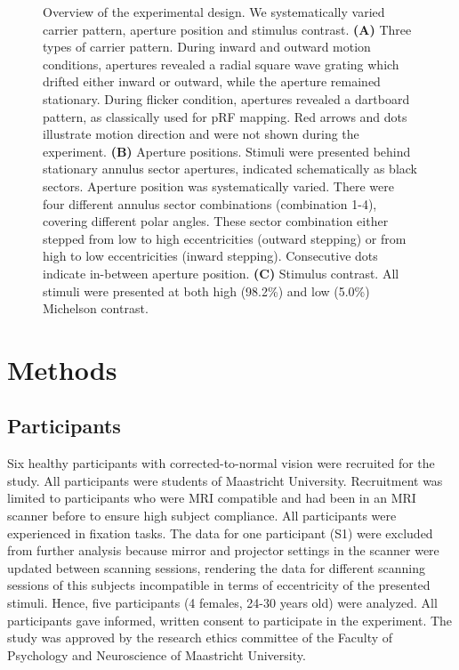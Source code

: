 \begin{figure}[ht!]
\ContinuedFloat
\captionsetup{labelformat=adja-page}
\caption{Overview of the experimental design. We systematically varied carrier pattern, aperture position and stimulus contrast. \textbf{(A)} Three types of carrier pattern. During inward and outward motion conditions, apertures revealed a radial square wave grating which drifted either inward or outward, while the aperture remained stationary. During flicker condition, apertures revealed a dartboard pattern, as classically used for pRF mapping. Red arrows and dots illustrate motion direction and were not shown during the experiment. \textbf{(B)} Aperture positions. Stimuli were presented behind stationary annulus sector apertures, indicated schematically as black sectors. Aperture position was systematically varied. There were four different annulus sector combinations (combination 1-4), covering different polar angles. These sector combination either stepped from low to high eccentricities (outward stepping) or from high to low eccentricities (inward stepping). Consecutive dots indicate in-between aperture position. \textbf{(C)} Stimulus contrast. All stimuli were presented at both high (98.2\%) and low (5.0\%) Michelson contrast.}
\label{fig:expOv}
\noindent\hrulefill
\end{figure}

\section{Methods}

\subsection{Participants}
Six healthy participants with corrected-to-normal vision were recruited for the study. All participants were students of Maastricht University. Recruitment was limited to participants who were MRI compatible and had been in an MRI scanner before to ensure high subject compliance. All participants were experienced in fixation tasks. The data for one participant (S1) were excluded from further analysis because mirror and projector settings in the scanner were updated between scanning sessions, rendering the data for different scanning sessions of this subjects incompatible in terms of eccentricity of the presented stimuli. Hence, five participants (4 females, 24-30 years old) were analyzed. All participants gave informed, written consent to participate in the experiment. The study was approved by the research ethics committee of the Faculty of Psychology and Neuroscience of Maastricht University.


